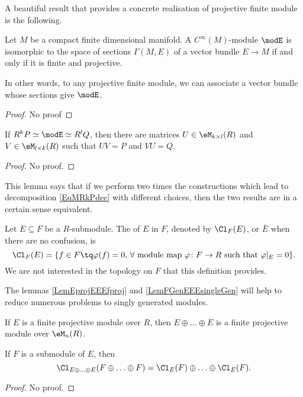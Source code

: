 A beautiful result that provides a concrete realisation of projective finite module is the following.

\begin{theorem}
Let $M$ be a compact finite dimensional manifold. A $C^{\infty}(M)$-module $\modE$ is isomorphic to the space of sections $\Gamma(M,E)$ of a vector bundle $E\to M$ if and only if it is finite and projective.

In other words, to any projective finite module, we can associate a vector bundle whose sections give $\modE$.
\end{theorem}

\begin{proof}
No proof
\end{proof}

\begin{lemma}		\label{LemRklQkR}
If $R^kP\simeq \modE\simeq R^lQ$, then there are matrices $U\in\eM_{k\times l}(R)$ and $V\in\eM_{l\times k}(R)$ such that $UV=P$ and $VU=Q$.
\end{lemma}
\begin{proof}
No proof.
\end{proof}
This lemma says that if we perform two times the constructions which lead to decomposition \eqref{EqMRkPdec} with different choices, then the two results are in a certain sense equivalent.

Let $E\subseteq F$ be a $R$-submodule. The  of $E$ in $F$, denoted by $\Cl_F(E)$, or $\bar E$ when there are no confusion, is
\begin{equation}
	\Cl_F(E)=\{ f\in F\tq \varphi(f)=0,\,\forall \text{ module map }\varphi\colon F\to R\text{ such that }\varphi|_E=0 \}.
\end{equation}
We are not interested in the topology on $F$ that this definition provides.

The lemmas \ref{LemEprojEEEfproj} and \ref{LemFGenEEEsingleGen} will help to reduce numerous problems to singly generated modules.
\begin{lemma}		\label{LemEprojEEEfproj}
If $E$ is a finite projective module over $R$, then $E\oplus\ldots\oplus E$ is a finite projective module over $\eM_n(R)$. 

If $F$ is a submodule of $E$, then
\[ 
	\Cl_{E\oplus\ldots\oplus E}(F\oplus\ldots\oplus F)=\Cl_E(F)\oplus\ldots\oplus\Cl_E(F).
\]

\end{lemma}
\begin{proof}
No proof.
\end{proof}

